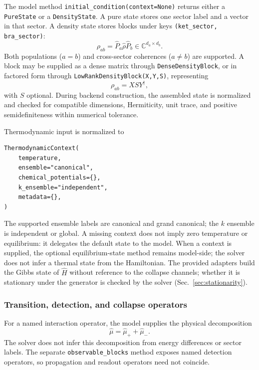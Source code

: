 \documentclass[11pt]{article}
\begin{document}
The model method \texttt{initial\_condition(context=None)} returns either a \texttt{PureState} or a \texttt{DensityState}. A pure state stores one sector label and a vector in that sector. A density state stores blocks under keys \texttt{(ket\_sector, bra\_sector)}:
\begin{equation}
    \rho_{ab}=\hat{P}_a\hat{\rho} \hat{P}_b\in\mathbb{C}^{d_a\times d_b}.
\end{equation}
Both populations ($a=b$) and cross-sector coherences ($a\neq b$) are supported. A block may be supplied as a dense matrix through \texttt{DenseDensityBlock}, or in factored form through \texttt{LowRankDensityBlock(X,Y,S)}, representing
\begin{equation}
    \rho_{ab}=X S Y^\dagger,
\end{equation}
with $S$ optional. During backend construction, the assembled state is normalized and checked for compatible dimensions, Hermiticity, unit trace, and positive semidefiniteness within numerical tolerance.

Thermodynamic input is normalized to
\begin{verbatim}
ThermodynamicContext(
    temperature,
    ensemble="canonical",
    chemical_potentials={},
    k_ensemble="independent",
    metadata={},
)
\end{verbatim}
The supported ensemble labels are canonical and grand canonical; the $k$ ensemble is independent or global. A missing context does not imply zero temperature or equilibrium: it delegates the default state to the model. When a context is supplied, the optional equilibrium-state method remains model-side; the solver does not infer a thermal state from the Hamiltonian. The provided adapters build the Gibbs state of $\hat H$ without reference to the collapse channels; whether it is stationary under the generator is checked by the solver (Sec.~\ref{sec:stationarity}).

\subsubsection{Transition, detection, and collapse operators}

For a named interaction operator, the model supplies the physical decomposition
\begin{equation}
    \hat{\mu}=\hat{\mu}_+ + \hat{\mu}_-.
\end{equation}
The solver does not infer this decomposition from energy differences or sector labels. The separate \texttt{observable\_blocks} method exposes named detection operators, so propagation and readout operators need not coincide.
\end{document}
